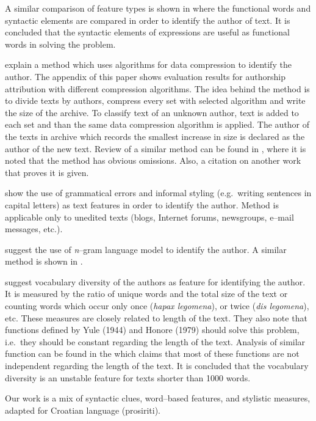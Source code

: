 \documentclass[11pt,english]{article}
\begin{document}
\begin{multicols}{2}
A similar comparison of feature types is shown in
\citep{uzuner2005comparative} where the functional words and syntactic
elements are compared in order to identify the author of text. It is
concluded that the syntactic elements of expressions are useful as functional words in solving the
problem.

\citet{kukushkina2001using} explain a method which uses algorithms for data
compression to identify the author. The appendix of this paper shows evaluation results
for authorship attribution with different compression algorithms. The idea behind
the method is to divide texts by authors, compress every set with selected
algorithm and write the size of the archive. To classify text of an unknown author,
text is added to each set and than the same data compression algorithm is applied. The author of
the texts in archive which records the smallest increase in size is declared
as the author of the new text. Review of a similar method can be found in 
\citep{zhao2005effective}, where it is noted that the method has obvious omissions. Also, a citation on another work that proves it is given.

\citet{koppel2003exploiting} show the use of grammatical errors and informal
styling (e.g.\ writing sentences in capital letters) as text features in
order to identify the author. Method is applicable only to unedited texts (blogs,
Internet forums, newsgroups, e--mail messages, etc.).

\citet{peng2003language} suggest the use of \emph{n}--gram language model to identify
the author. A similar method is shown in \citep{coyotl2006authorship}.

\citet{stamatatos2001computer} suggest vocabulary diversity of the authors as
feature for identifying the author. It is measured by the ratio of unique words
and the total size of the text or counting words which occur only once
(\emph{hapax legomena}), or twice (\emph{dis legomena}), etc.
These measures are closely related to length of the text. They also note that
functions defined by Yule (1944) and Honore (1979) should solve this problem,
i.e.\ they should be constant regarding the length of the text. Analysis of
similar function can be found in the \citep{tweedie1998variable} which claims
that most of these functions are not independent regarding the length of the
text. It is concluded that the vocabulary diversity is an unstable feature for
texts shorter than 1000 words.

Our work is a mix of syntactic clues, word--based features, and stylistic measures, adapted for Croatian language (prosiriti).


\end{multicols}
\end{document}
